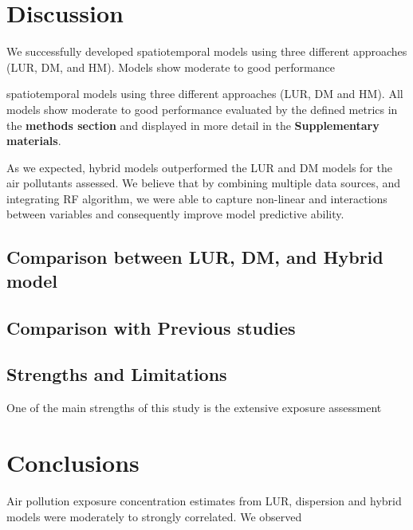 \documentclass{article}
\begin{document}
\newpage
\section{Discussion}
We successfully developed spatiotemporal models using three different approaches (LUR, DM, and HM). Models show moderate to good performance 



spatiotemporal models using three different approaches (LUR, DM and HM). All models show moderate to good performance evaluated by the defined metrics in the \textbf{methods section} and displayed in more detail in the \textbf{Supplementary materials}. 

As we expected, hybrid models outperformed the LUR and DM models for the air pollutants assessed. We believe that by combining multiple data sources, and integrating RF algorithm, we were able to capture non-linear and interactions between variables and consequently improve model predictive ability. 

\subsection{Comparison between LUR, DM, and Hybrid model}






\subsection{Comparison with Previous studies}




\subsection{Strengths and Limitations}
One of the main strengths of this study is the extensive exposure assessment 

\section{Conclusions}

Air pollution exposure concentration estimates from LUR, dispersion and hybrid models were moderately to strongly correlated. We observed 



































\newpage


\end{document}
